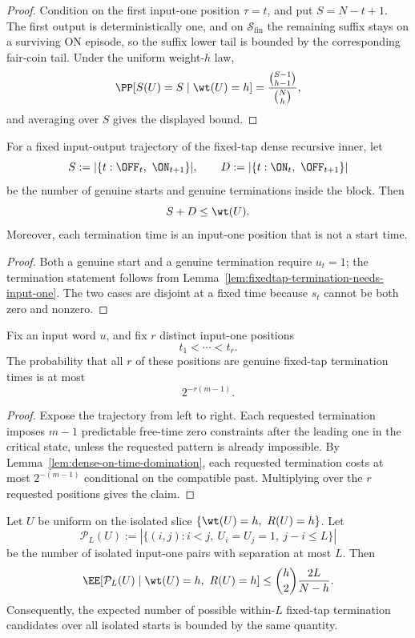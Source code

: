 \begin{proof}
Condition on the first input-one position \(\tau=t\), and put \(S=N-t+1\). The first output is deterministically one,
and on \(\mathcal{S}_{\mathrm{fin}}\) the remaining suffix stays on a surviving ON episode, so the suffix lower tail is
bounded by the corresponding fair-coin tail. Under the uniform weight-\(h\) law,
\[
\PP[S(U)=S\mid \wt(U)=h]=\frac{\binom{S-1}{h-1}}{\binom{N}{h}},
\]
and averaging over \(S\) gives the displayed bound.
\end{proof}

\begin{lemma}
\label{lem:fixedtap-episode-budget}
For a fixed input-output trajectory of the fixed-tap dense recursive inner, let
\[
S:=|\{t:\OFF_t,\ \ON_{t+1}\}|,
\qquad
D:=|\{t:\ON_t,\ \OFF_{t+1}\}|
\]
be the number of genuine starts and genuine terminations inside the block. Then
\[
S+D \le \wt(U).
\]
Moreover, each termination time is an input-one position that is not a start time.
\end{lemma}

\begin{proof}
Both a genuine start and a genuine termination require \(u_t=1\); the termination statement follows from
Lemma~\ref{lem:fixedtap-termination-needs-input-one}. The two cases are disjoint at a fixed time because \(s_t\)
cannot be both zero and nonzero.
\end{proof}

\begin{lemma}
\label{lem:fixedtap-multicandidate-termination}
Fix an input word \(u\), and fix \(r\) distinct input-one positions
\[
t_1<\cdots<t_r.
\]
The probability that all \(r\) of these positions are genuine fixed-tap termination times is at most
\[
2^{-r(m-1)}.
\]
\end{lemma}

\begin{proof}
Expose the trajectory from left to right. Each requested termination imposes \(m-1\) predictable free-time zero
constraints after the leading one in the critical state, unless the requested pattern is already impossible. By
Lemma~\ref{lem:dense-on-time-domination}, each requested termination costs at most \(2^{-(m-1)}\) conditional on the
compatible past. Multiplying over the \(r\) requested positions gives the claim.
\end{proof}

\begin{corollary}
\label{cor:fixedtap-isolated-pair-candidates}
Let \(U\) be uniform on the isolated slice \(\{\wt(U)=h,\ R(U)=h\}\). Let
\[
\mathcal{P}_L(U)
:=
|\{(i,j): i<j,\ U_i=U_j=1,\ j-i\le L\}|
\]
be the number of isolated input-one pairs with separation at most \(L\). Then
\[
\EE[\mathcal{P}_L(U)\mid \wt(U)=h,\ R(U)=h]
\le
\binom{h}{2}\frac{2L}{N-h}.
\]
Consequently, the expected number of possible within-\(L\) fixed-tap termination candidates over all isolated starts is
bounded by the same quantity.
\end{corollary}

